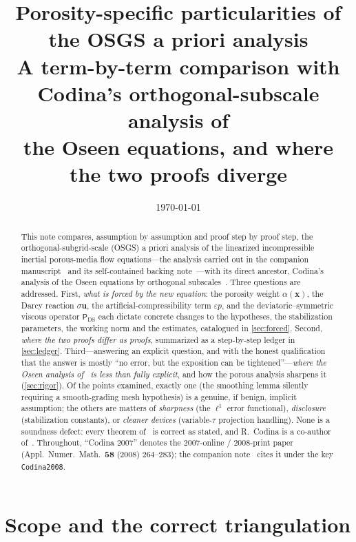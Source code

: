 \documentclass[11pt]{article}
\title{Porosity-specific particularities of the OSGS a priori analysis\\[0.4ex]
\large A term-by-term comparison with Codina's orthogonal-subscale analysis of\\
the Oseen equations, and where the two proofs diverge}
\author{}
\date{\today}
\theoremstyle{remark}
\newcommand{\bu}{\boldsymbol{u}}
\newcommand{\ViscProj}{\mathsf{P}_{\mathrm{DS}}}
\begin{document}
\maketitle

\begin{abstract}
This note compares, assumption by assumption and proof step by proof step, the
orthogonal-subgrid-scale (OSGS) a priori analysis of the linearized incompressible
inertial porous-media flow equations---the analysis carried out in the companion
manuscript~\cite{companion} and its self-contained backing note~\cite{osgsnote}---with
its direct ancestor, Codina's analysis of the Oseen equations by orthogonal
subscales~\cite{Codina2008}. Three questions are addressed. First, \emph{what is forced
by the new equation}: the porosity weight $\alpha(\boldsymbol x)$, the Darcy reaction
$\sigma\bu$, the artificial-compressibility term $\varepsilon p$, and the
deviatoric--symmetric viscous operator $\ViscProj$ each dictate concrete changes to the
hypotheses, the stabilization parameters, the working norm and the estimates, catalogued
in \cref{sec:forced}. Second, \emph{where the two proofs differ as proofs}, summarized as
a step-by-step ledger in \cref{sec:ledger}. Third---answering an explicit question, and
with the honest qualification that the answer is mostly ``no error, but the exposition can
be tightened''---\emph{where the Oseen analysis of~\cite{Codina2008} is less than fully
explicit}, and how the porous analysis sharpens it (\cref{sec:rigor}). Of the points
examined, exactly one (the smoothing lemma silently requiring a smooth-grading mesh
hypothesis) is a genuine, if benign, implicit assumption; the others are matters of
\emph{sharpness} (the $\ell^1$ error functional), \emph{disclosure} (stabilization
constants), or \emph{cleaner devices} (variable-$\tau$ projection handling). None is a
soundness defect: every theorem of~\cite{Codina2008} is correct as stated, and
R.~Codina is a co-author of~\cite{companion}. Throughout, ``Codina 2007'' denotes the
2007-online / 2008-print paper~\cite{Codina2008} (Appl.\ Numer.\ Math.\ \textbf{58}
(2008) 264--283); the companion note~\cite{osgsnote} cites it under the key
\texttt{Codina2008}.
\end{abstract}

\newpage
\tableofcontents
\newpage

\section{Scope and the correct triangulation}
\label{sec:scope}
\end{document}
